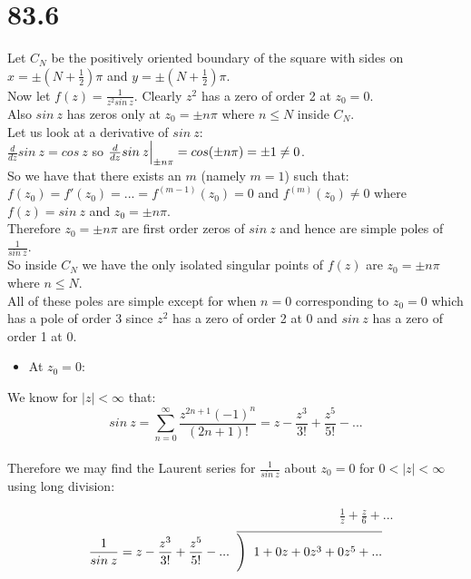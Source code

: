 \documentclass{article}
\begin{document}
\newpage
\section*{83.6}
\begin{center}
    \doublespacing
    Let $C_N$ be the positively oriented boundary of the square with sides on $x =\pm (N +\frac{1}{2})\pi$ and $y =\pm (N +\frac{1}{2})\pi$.
    \\Now let $f(z) =\frac{1}{z^2 sin\:z}$. Clearly $z^2$ has a zero of order 2 at $z_0 = 0$.
    \\Also $sin\:z$ has zeros only at $z_0 =\pm n\pi$ where $n\leq N$ inside $C_N$.
    \\Let us look at a derivative of $sin\:z$:
    \\$\frac{d}{dz} sin\:z = cos\:z$ so $\frac{d}{dz} sin\:z\Big{|}_{\pm n\pi} = cos(\pm n\pi) =\pm 1\neq 0$.
    \\So we have that there exists an $m$ (namely $m=1$) such that:
    \\$f(z_0) = f'(z_0) = ... = f^{(m-1)} (z_0) = 0$ and $f^{(m)} (z_0)\neq 0$ where $f(z) = sin\:z$ and $z_0 =\pm n\pi$.
    \\Therefore $z_0 =\pm n\pi$ are first order zeros of $sin\:z$ and hence are simple poles of $\frac{1}{sin\:z}$.
    \\So inside $C_N$ we have the only isolated singular points of $f(z)$ are $z_0 =\pm n\pi$ where $n\leq N$.
    \\All of these poles are simple except for when $n = 0$ corresponding to $z_0 = 0$ which has a pole of order 3 since $z^2$ has a zero of order 2 at 0 and $sin\:z$ has a zero of order 1 at 0.
\end{center}
\begin{itemize}
    \item At $z_0 = 0$:
\end{itemize}
\begin{center}
    \doublespacing
    We know for $|z| <\infty$ that:
    \[sin\:z =\sum _{n=0}^{\infty}\frac{z^{2n+1} (-1)^{n}}{(2n+1)!} = z -\frac{z^3}{3!} +\frac{z^5}{5!} - ...\]
    \\Therefore we may find the Laurent series for $\frac{1}{sin\:z}$ about $z_0 = 0$ for $0 < |z| <\infty$ using long division:
\end{center}
$\;\;\;\;\;\;\;\;\;\;\;\;\;\;\;\;\;\;\;\;\;\;\;\;\;\;\;\;\;\;\;\;\;\;\;\;\;\;\;\;\;\;\;\;\;\;\;\;\;\;\;\;\;\;\;\;\;\;\;\;\;\;\;\;\;\;\;\;\;\;\;\;\;\;\;\;\;\;\;\;\;\;\;\;\;\;\;\;\;\;\;\;\;\;\frac{1}{z} +\frac{z}{6} + ...$
\[\frac{1}{sin\:z} = z -\frac{z^3}{3!} +\frac{z^5}{5!} -...\;\;\overline{\Bigg{)}\;\; 1 + 0z + 0z^3 + 0z^5 + ...}\]
\end{document}
